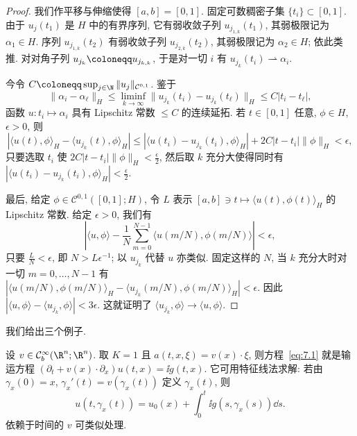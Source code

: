 \begin{proof}
我们作平移与伸缩使得 $[a, b] = [0, 1]$. 固定可数稠密子集 $\{t_i\} \subset [0, 1]$. 由于 $u_j(t_1)$ 是 $H$ 中的有界序列, 它有弱收敛子列 $u_{j_{1, k}}(t_1)$, 其弱极限记为 $\alpha_1 \in H$. 序列 $u_{j_{1, k}}(t_2)$ 有弱收敛子列 $u_{j_{2, k}}(t_2)$, 其弱极限记为 $\alpha_2 \in H$; 依此类推. 对对角子列 $u_{j_k} \defeq u_{j_{k, k}}$, 于是对一切 $i$ 有 $u_{j_k}(t_i) \rightharpoonup \alpha_i$.

今令 $C \defeq \sup_{j \in \N} \| u_j \|_{\mathcal{C}^{0,1}}$. 鉴于
\begin{equation}\label{eq:7.13}
    \| \alpha_i - \alpha_\ell \|_H
    \le \liminf_{k \to \infty} \| u_{j_k}(t_i) - u_{j_k}(t_\ell) \|_H
    \le C | t_i - t_\ell |,
\end{equation}
函数 $u \colon t_i \mapsto \alpha_i$ 具有 Lipschitz 常数 $\le C$ 的连续延拓. 若 $t \in [0, 1]$ 任意, $\phi \in H$, $\epsilon > 0$, 则
\begin{equation}\label{eq:7.14}
    \left| \langle u(t), \phi \rangle_H - \langle u_{j_k}(t), \phi \rangle_H \right|
    \le \left| \langle u(t_i) - u_{j_k}(t_i), \phi \rangle_H \right| + 2C | t - t_i | \| \phi \|_H < \epsilon,
\end{equation}
只要选取 $t_i$ 使 $2C | t - t_i | \| \phi \|_H < \frac{\epsilon}{2}$, 然后取 $k$ 充分大使得同时有 $\left| \langle u(t_i) - u_{j_k}(t_i), \phi \rangle_H \right| < \frac{\epsilon}{2}$.

最后, 给定 $\phi \in \mathcal{C}^{0,1}([0, 1]; H)$, 令 $L$ 表示 $[a, b] \ni t \mapsto \langle u(t), \phi(t) \rangle_H$ 的 Lipschitz 常数. 给定 $\epsilon > 0$, 我们有
\begin{equation}\label{eq:7.15}
    \left| \langle u, \phi \rangle - \frac{1}{N} \sum_{m=0}^{N-1} \langle u(m/N), \phi(m/N) \rangle \right| < \epsilon,
\end{equation}
只要 $\frac{L}{N} < \epsilon$, 即 $N > L \epsilon^{-1}$; 以 $u_{j_k}$ 代替 $u$ 亦类似. 固定这样的 $N$, 当 $k$ 充分大时对一切 $m = 0, \ldots, N-1$ 有 $\left| \langle u(m/N), \phi(m/N) \rangle_H - \langle u_{j_k}(m/N), \phi(m/N) \rangle_H \right| < \epsilon$. 因此 $\left| \langle u, \phi \rangle - \langle u_{j_k}, \phi \rangle \right| < 3\epsilon$. 这就证明了 $\langle u_{j_k}, \phi \rangle \to \langle u, \phi \rangle$.
\end{proof}

我们给出三个例子.

\begin{example}[输运方程]\label{eg:7.3}
设 $v \in \mathcal{C}^\infty_b(\R^n; \R^n)$. 取 $K = 1$ 且 $a(t, x, \xi) = v(x) \cdot \xi$, 则方程~\eqref{eq:7.1} 就是输运方程 $(\partial_t + v(x) \cdot \partial_x)u(t, x) = \ii g(t, x)$. 它可用特征线法求解: 若由 $\gamma_x(0) = x$, $\gamma_x'(t) = v(\gamma_x(t))$ 定义 $\gamma_x(t)$, 则
\begin{equation*}
    u(t, \gamma_x(t)) = u_0(x) + \int_0^t \ii g(s, \gamma_x(s)) \dd s.
\end{equation*}
依赖于时间的 $v$ 可类似处理.
\end{example}

